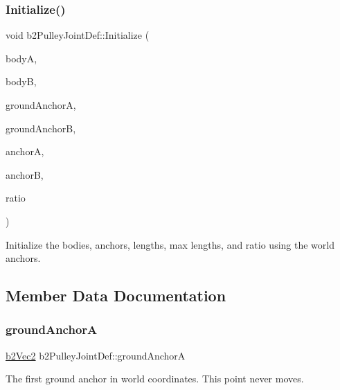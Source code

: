 \subsubsection{\texorpdfstring{Initialize()}{Initialize()}}
{\footnotesize\ttfamily void b2\+Pulley\+Joint\+Def\+::\+Initialize (\begin{DoxyParamCaption}\item[{\mbox{\hyperlink{classb2_body}{b2\+Body}} $\ast$}]{bodyA,  }\item[{\mbox{\hyperlink{classb2_body}{b2\+Body}} $\ast$}]{bodyB,  }\item[{const \mbox{\hyperlink{structb2_vec2}{b2\+Vec2}} \&}]{ground\+AnchorA,  }\item[{const \mbox{\hyperlink{structb2_vec2}{b2\+Vec2}} \&}]{ground\+AnchorB,  }\item[{const \mbox{\hyperlink{structb2_vec2}{b2\+Vec2}} \&}]{anchorA,  }\item[{const \mbox{\hyperlink{structb2_vec2}{b2\+Vec2}} \&}]{anchorB,  }\item[{\mbox{\hyperlink{b2_settings_8h_aacdc525d6f7bddb3ae95d5c311bd06a1}{float32}}}]{ratio }\end{DoxyParamCaption})}



Initialize the bodies, anchors, lengths, max lengths, and ratio using the world anchors. 



\subsection{Member Data Documentation}
\mbox{\label{structb2_pulley_joint_def_aae77c020ce4629ab9e03560e28aa853d}} 
\subsubsection{\texorpdfstring{groundAnchorA}{groundAnchorA}}
{\footnotesize\ttfamily \mbox{\hyperlink{structb2_vec2}{b2\+Vec2}} b2\+Pulley\+Joint\+Def\+::ground\+AnchorA}



The first ground anchor in world coordinates. This point never moves. 

\mbox{\label{structb2_pulley_joint_def_aa412b9f3bffd1fb69ace14f9b3e03b82}} 

